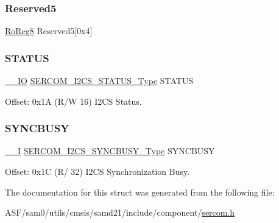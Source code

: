 \mbox{\label{struct_sercom_i2cs_af634d69e5f383b470ab708b5f102a227}} 
\subsubsection{\texorpdfstring{Reserved5}{Reserved5}}
{\footnotesize\ttfamily \mbox{\hyperlink{group___s_a_m_d21_e15_a__definitions_ga0d957f1433aaf5d70e4dc2b68288442d}{Ro\+Reg8}} Reserved5\mbox{[}0x4\mbox{]}}

\mbox{\label{struct_sercom_i2cs_a79a5db5b9d6d22550c597a60aa286330}} 
\subsubsection{\texorpdfstring{STATUS}{STATUS}}
{\footnotesize\ttfamily \mbox{\hyperlink{core__cm0plus_8h_aec43007d9998a0a0e01faede4133d6be}{\+\_\+\+\_\+\+IO}} \mbox{\hyperlink{union_s_e_r_c_o_m___i2_c_s___s_t_a_t_u_s___type}{S\+E\+R\+C\+O\+M\+\_\+\+I2\+C\+S\+\_\+\+S\+T\+A\+T\+U\+S\+\_\+\+Type}} S\+T\+A\+T\+US}



Offset\+: 0x1A (R/W 16) I2\+CS Status. 

\mbox{\label{struct_sercom_i2cs_a80db8bcc49375996ab811cf9d8b89664}} 
\subsubsection{\texorpdfstring{SYNCBUSY}{SYNCBUSY}}
{\footnotesize\ttfamily \mbox{\hyperlink{core__cm0plus_8h_af63697ed9952cc71e1225efe205f6cd3}{\+\_\+\+\_\+I}} \mbox{\hyperlink{union_s_e_r_c_o_m___i2_c_s___s_y_n_c_b_u_s_y___type}{S\+E\+R\+C\+O\+M\+\_\+\+I2\+C\+S\+\_\+\+S\+Y\+N\+C\+B\+U\+S\+Y\+\_\+\+Type}} S\+Y\+N\+C\+B\+U\+SY}



Offset\+: 0x1C (R/ 32) I2\+CS Synchronization Busy. 



The documentation for this struct was generated from the following file\+:\begin{DoxyCompactItemize}
\item 
A\+S\+F/sam0/utils/cmsis/samd21/include/component/\mbox{\hyperlink{utils_2cmsis_2samd21_2include_2component_2sercom_8h}{sercom.\+h}}\end{DoxyCompactItemize}

